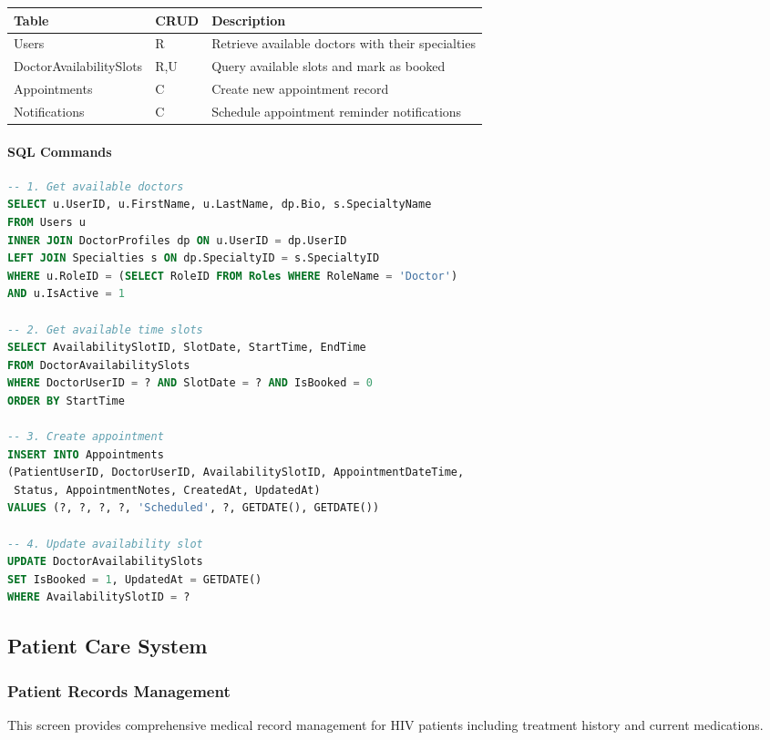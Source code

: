 \documentclass[12pt,a4paper]{article}
\begin{document}
\begin{longtable}{|p{3cm}|p{2cm}|p{9cm}|}
\hline
\textbf{Table} & \textbf{CRUD} & \textbf{Description} \\
\hline
Users & R & Retrieve available doctors with their specialties \\
\hline
DoctorAvailabilitySlots & R,U & Query available slots and mark as booked \\
\hline
Appointments & C & Create new appointment record \\
\hline
Notifications & C & Schedule appointment reminder notifications \\
\hline
\end{longtable}

\paragraph{SQL Commands}

\begin{lstlisting}[language=SQL]
-- 1. Get available doctors
SELECT u.UserID, u.FirstName, u.LastName, dp.Bio, s.SpecialtyName
FROM Users u
INNER JOIN DoctorProfiles dp ON u.UserID = dp.UserID
LEFT JOIN Specialties s ON dp.SpecialtyID = s.SpecialtyID
WHERE u.RoleID = (SELECT RoleID FROM Roles WHERE RoleName = 'Doctor')
AND u.IsActive = 1

-- 2. Get available time slots
SELECT AvailabilitySlotID, SlotDate, StartTime, EndTime
FROM DoctorAvailabilitySlots
WHERE DoctorUserID = ? AND SlotDate = ? AND IsBooked = 0
ORDER BY StartTime

-- 3. Create appointment
INSERT INTO Appointments 
(PatientUserID, DoctorUserID, AvailabilitySlotID, AppointmentDateTime, 
 Status, AppointmentNotes, CreatedAt, UpdatedAt)
VALUES (?, ?, ?, ?, 'Scheduled', ?, GETDATE(), GETDATE())

-- 4. Update availability slot
UPDATE DoctorAvailabilitySlots 
SET IsBooked = 1, UpdatedAt = GETDATE()
WHERE AvailabilitySlotID = ?
\end{lstlisting}

\subsection{Patient Care System}

\subsubsection{Patient Records Management}

This screen provides comprehensive medical record management for HIV patients including treatment history and current medications.
\end{document}
